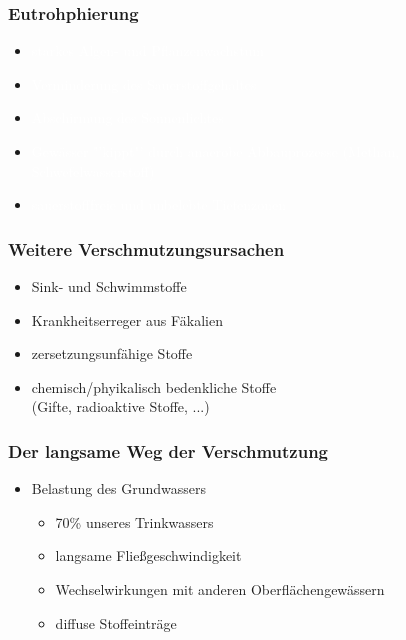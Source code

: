 \documentclass{beamer}
\begin{document}
	{%
		\begin{frame}[plain]
			\frametitle{Eutrohphierung}
			\LARGE
			
			\begin{itemize}
				\item \textcolor{white}{starkes Algen- und Pflanzenwachstum}
				\item \textcolor{white}{Verminderung des Sauerstoffgehaltes}
				\item \textcolor{white}{Abschirmung des Sonnenlichtes}
				\item \textcolor{white}{Gewässer "'kippt"' durch anaerobe Abbauprozesse (Methan, Schwefelwasserstoff)}
				\item \textcolor{white}{sauerstofffreie und unbelebte Tiefenzonen}
			\end{itemize}
			
		
		\end{frame}
		
	}%
	
	\begin{frame}
		\frametitle{Weitere Verschmutzungsursachen}
		\LARGE
		\begin{itemize}
			\item Sink- und Schwimmstoffe
			\item Krankheitserreger aus Fäkalien
			\item zersetzungsunfähige Stoffe
			\item chemisch/phyikalisch bedenkliche Stoffe \\{\normalsize (Gifte, radioaktive Stoffe, ...)} 
		\end{itemize}
	\end{frame}

	
	\begin{frame}
		\frametitle{Der langsame Weg der Verschmutzung}
		\LARGE
		
		\begin{itemize}
			\item Belastung des Grundwassers
			\begin{itemize}
				\LARGE
				\item 70\% unseres Trinkwassers
				
				\item langsame Fließgeschwindigkeit
				
				\item Wechselwirkungen mit anderen Oberflächengewässern
				
				\item diffuse Stoffeinträge
			\end{itemize}
			
		\end{itemize}
	\end{frame}
	
\end{document}
